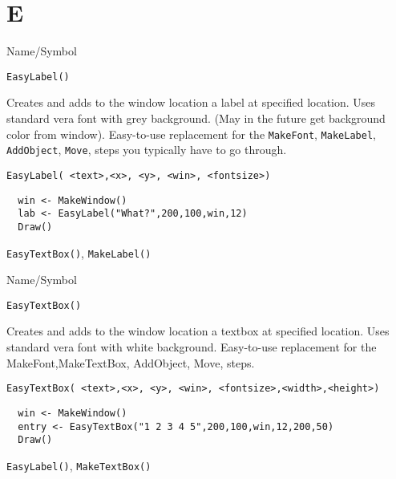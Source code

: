 \rl
\section{E}
\rl


\begin{desc}{Name/Symbol}
\item[Name/Symbol]	\verb+EasyLabel()+

\item[Description] Creates and adds to the window location a label
  at specified location. Uses standard vera font with grey background.
   (May in the future get background color from window).
  Easy-to-use replacement for the \verb+MakeFont+, \verb+MakeLabel+,
  \verb+AddObject+, \verb+Move+, steps you typically have to go through.

\item[Usage]
\begin{verbatim}
EasyLabel( <text>,<x>, <y>, <win>, <fontsize>)
\end{verbatim}

\item[Example]	
\begin{verbatim}
  win <- MakeWindow()
  lab <- EasyLabel("What?",200,100,win,12)
  Draw()
\end{verbatim}
\item[See Also]	
\verb+EasyTextBox()+, \verb+MakeLabel()+
\end{desc}


\rl

\begin{desc}{Name/Symbol}
\item[Name/Symbol]	\verb+EasyTextBox()+

\item[Description] Creates and adds to the window location a textbox
  at specified location. Uses standard vera font with white background.
  Easy-to-use replacement for the MakeFont,MakeTextBox,
  AddObject, Move, steps.

\item[Usage]
\begin{verbatim}
EasyTextBox( <text>,<x>, <y>, <win>, <fontsize>,<width>,<height>)
\end{verbatim}

\item[Example]	
\begin{verbatim}
  win <- MakeWindow()
  entry <- EasyTextBox("1 2 3 4 5",200,100,win,12,200,50)
  Draw()
\end{verbatim}
\item[See Also]	
\verb+EasyLabel()+, \verb+MakeTextBox()+
\end{desc}
\rl


